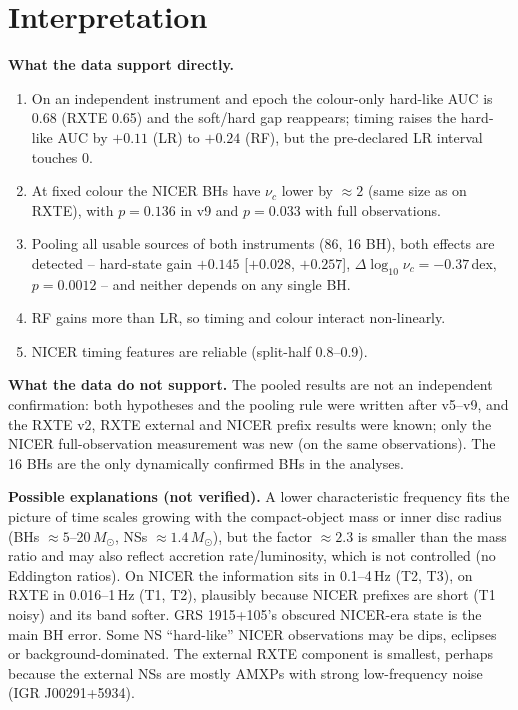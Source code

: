 \section{Interpretation}
\textbf{What the data support directly.}
\begin{enumerate}
\item On an independent instrument and epoch the colour-only hard-like AUC is 0.68 (RXTE 0.65) and the soft/hard gap reappears;
timing raises the hard-like AUC by $+0.11$ (LR) to $+0.24$ (RF), but the pre-declared LR interval touches 0.
\item At fixed colour the NICER BHs have $\nu_c$ lower by $\approx2$ (same size as on RXTE), with $p=0.136$ in v9 and $p=0.033$ with full
observations.
\item Pooling all usable sources of both instruments (86, 16 BH), both effects are detected -- hard-state gain $+0.145$ [$+0.028$,
$+0.257$], $\Delta\log_{10}\nu_c=-0.37$\,dex, $p=0.0012$ -- and neither depends on any single BH.
\item RF gains more than LR, so timing and colour interact non-linearly.
\item NICER timing features are reliable (split-half 0.8--0.9).
\end{enumerate}

\textbf{What the data do not support.} The pooled results are not an independent confirmation: both hypotheses and the pooling rule
were written after v5--v9, and the RXTE v2, RXTE external and NICER prefix results were known; only the NICER full-observation
measurement was new (on the same observations). The 16 BHs are the only dynamically confirmed BHs in the analyses.

\textbf{Possible explanations (not verified).} A lower characteristic frequency fits the picture of time scales growing with the
compact-object mass or inner disc radius (BHs $\approx5$--20\,$M_\odot$, NSs $\approx1.4\,M_\odot$), but the factor $\approx2.3$ is smaller than the
mass ratio and may also reflect accretion rate/luminosity, which is not controlled (no Eddington ratios). On NICER the information sits
in 0.1--4\,Hz (T2, T3), on RXTE in 0.016--1\,Hz (T1, T2), plausibly because NICER prefixes are short (T1 noisy) and its band softer.
GRS 1915+105's obscured NICER-era state is the main BH error. Some NS ``hard-like'' NICER observations may be dips, eclipses or
background-dominated. The external RXTE component is smallest, perhaps because the external NSs are mostly AMXPs with strong
low-frequency noise (IGR J00291+5934).


